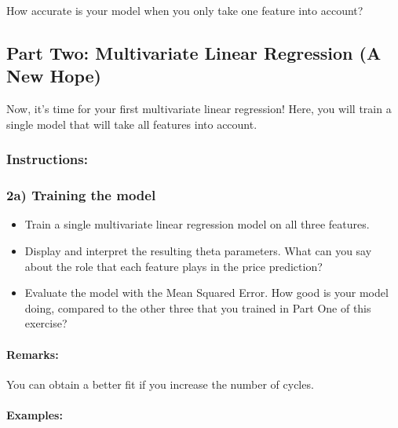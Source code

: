 \documentclass[]{article}
\let\oldparagraph\paragraph
\renewcommand{\paragraph}[1]{\oldparagraph{#1}\mbox{}}
\begin{document}
How accurate is your model when you only take one feature into account?

\hypertarget{part-two-multivariate-linear-regression-a-new-hope}{%
\subsection{Part Two: Multivariate Linear Regression (A New
Hope)}\label{part-two-multivariate-linear-regression-a-new-hope}}

Now, it's time for your first multivariate linear regression! Here, you
will train a single model that will take all features into account.

\hypertarget{instructions-9}{%
\subsubsection{Instructions:}\label{instructions-9}}

\hypertarget{a-training-the-model}{%
\subsubsection{2a) Training the model}\label{a-training-the-model}}

\begin{itemize}
\item
  Train a single multivariate linear regression model on all three
  features.
\item
  Display and interpret the resulting theta parameters. What can you say
  about the role that each feature plays in the price prediction?
\item
  Evaluate the model with the Mean Squared Error. How good is your model
  doing, compared to the other three that you trained in Part One of
  this exercise?
\end{itemize}

\hypertarget{remarks-1}{%
\paragraph{Remarks:}\label{remarks-1}}

You can obtain a better fit if you increase the number of cycles.

\hypertarget{examples-8}{%
\paragraph{Examples:}\label{examples-8}}
\end{document}
